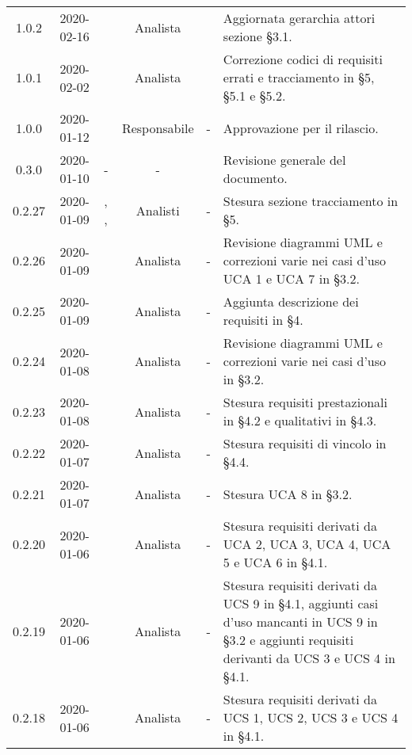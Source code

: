 {\begin{longtable}{ c c  C{2.3cm} c C{3cm} C{3.2cm}}
1.0.2 & 2020-02-16 & \AT{} & Analista & \CE{} & Aggiornata gerarchia attori sezione §3.1. \\

1.0.1 & 2020-02-02 & \AT{} & Analista & \CE{} & Correzione codici di requisiti errati e tracciamento in §5, §5.1 e §5.2. \\

1.0.0 & 2020-01-12 & \AT{} & Responsabile & - & Approvazione per il rilascio. \\

0.3.0 & 2020-01-10 & - & - & \SE{} & Revisione generale del documento. \\

0.2.27 & 2020-01-09 & \CE{}, \PF{}, \DF{} & Analisti & - & Stesura sezione tracciamento in §5. \\

0.2.26 & 2020-01-09 & \PF{} & Analista & - & Revisione diagrammi UML e correzioni varie nei casi d'uso UCA 1 e UCA 7 in §3.2. \\

0.2.25 & 2020-01-09 & \CE{} & Analista & - & Aggiunta descrizione dei requisiti in §4. \\

0.2.24 & 2020-01-08 & \CE{} & Analista & - & Revisione diagrammi UML e correzioni varie nei casi d'uso in §3.2. \\

0.2.23 & 2020-01-08 & \DF{} & Analista & - & Stesura requisiti prestazionali in §4.2 e qualitativi in §4.3. \\

0.2.22 & 2020-01-07 & \PF{} & Analista & - & Stesura requisiti di vincolo in §4.4. \\

0.2.21 & 2020-01-07 & \PF{} & Analista & - & Stesura UCA 8 in §3.2. \\

0.2.20 & 2020-01-06 & \PF{} & Analista & - & Stesura requisiti derivati da UCA 2, UCA 3, UCA 4, UCA 5 e UCA 6 in §4.1. \\

0.2.19 & 2020-01-06 & \DF{} & Analista & - & Stesura requisiti derivati da UCS 9 in §4.1, aggiunti casi d'uso mancanti in UCS 9 in §3.2 e aggiunti requisiti derivanti da UCS 3 e UCS 4 in §4.1. \\

0.2.18 & 2020-01-06 & \CE{} & Analista & - & Stesura requisiti derivati da UCS 1, UCS 2, UCS 3 e UCS 4 in §4.1. \\


\end{longtable}}
